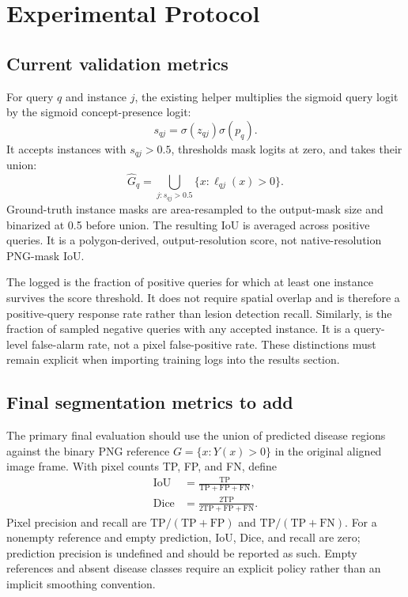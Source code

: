 \section{Experimental Protocol}
\label{sec:protocol}
\subsection{Current validation metrics}
For query $q$ and instance $j$, the existing helper multiplies the sigmoid query logit by the sigmoid concept-presence logit:
\begin{equation}
 s_{qj}=\sigma(z_{qj})\sigma(p_q).
\end{equation}
It accepts instances with $s_{qj}>0.5$, thresholds mask logits at zero, and takes their union:
\begin{equation}
 \widehat G_q=\bigcup_{j:s_{qj}>0.5}\{x:\ell_{qj}(x)>0\}.
\end{equation}
Ground-truth instance masks are area-resampled to the output-mask size and binarized at 0.5 before union. The resulting IoU is averaged across positive queries. It is a polygon-derived, output-resolution score, not native-resolution PNG-mask IoU.

The logged  is the fraction of positive queries for which at least one instance survives the score threshold. It does not require spatial overlap and is therefore a positive-query response rate rather than lesion detection recall. Similarly,  is the fraction of sampled negative queries with any accepted instance. It is a query-level false-alarm rate, not a pixel false-positive rate. These distinctions must remain explicit when importing training logs into the results section.

\subsection{Final segmentation metrics to add}
The primary final evaluation should use the union of predicted disease regions against the binary PNG reference $G=\{x:Y(x)>0\}$ in the original aligned image frame. With pixel counts TP, FP, and FN, define
\begin{align}
\mathrm{IoU}&=\frac{\mathrm{TP}}{\mathrm{TP}+\mathrm{FP}+\mathrm{FN}},\\
\mathrm{Dice}&=\frac{2\mathrm{TP}}{2\mathrm{TP}+\mathrm{FP}+\mathrm{FN}}.
\end{align}
Pixel precision and recall are $\mathrm{TP}/(\mathrm{TP}+\mathrm{FP})$ and $\mathrm{TP}/(\mathrm{TP}+\mathrm{FN})$. For a nonempty reference and empty prediction, IoU, Dice, and recall are zero; prediction precision is undefined and should be reported as such. Empty references and absent disease classes require an explicit policy rather than an implicit smoothing convention.


